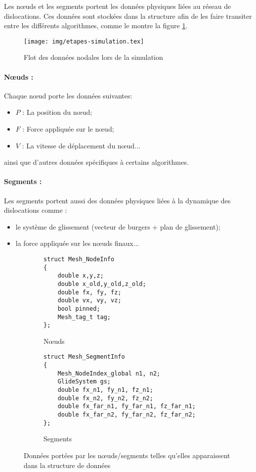 \documentclass[11pt,class=article,float=false,crop=false]{standalone}
\begin{document}
Les nœuds et les segments portent les données physiques liées au réseau de dislocations. Ces données sont stockées dans la structure afin de les faire transiter entre les différents algorithmes, comme le montre la figure \ref{fig:flot_donnees}.

\begin{figure}[H]
\centering
\texttt{[image: img/etapes-simulation.tex]}
\caption{Flot des données nodales lors de la simulation}
\label{fig:flot_donnees}
\end{figure}

\paragraph{Nœuds :}
Chaque nœud porte les données suivantes:
\begin{itemize}
\item $P$ : La position du nœud;
\item $F$ : Force appliquée sur le nœud;
\item $V$ : La vitesse de déplacement du nœud...
\end{itemize}
ainsi que d'autres données spécifiques à certains algorithmes.

\paragraph{Segments :}
Les segments portent aussi des données physiques liées à la dynamique des dislocations comme : 
\begin{itemize}
\item le système de glissement (vecteur de burgers + plan de glissement);
\item la force appliquée sur les nœuds finaux...
\end{itemize}

\begin{figure}
\centering
\begin{subfigure}[b]{0.47\textwidth}
\centering
\begin{verbatim}
struct Mesh_NodeInfo
{
    double x,y,z;
    double x_old,y_old,z_old;
    double fx, fy, fz;
    double vx, vy, vz;
    bool pinned;
    Mesh_tag_t tag;
};
\end{verbatim}
\caption{Nœuds}
\end{subfigure}
\begin{subfigure}[b]{0.47\textwidth}
\centering
\begin{verbatim}
struct Mesh_SegmentInfo
{    
    Mesh_NodeIndex_global n1, n2;
    GlideSystem gs;
    double fx_n1, fy_n1, fz_n1;
    double fx_n2, fy_n2, fz_n2;
    double fx_far_n1, fy_far_n1, fz_far_n1;
    double fx_far_n2, fy_far_n2, fz_far_n2;
};
\end{verbatim}
\caption{Segments}
\end{subfigure}
\caption{Données portées par les nœuds/segments telles qu'elles apparaissent dans la structure de données}
\label{fig:Mesh_ObjectInfo}
\end{figure}
\end{document}
